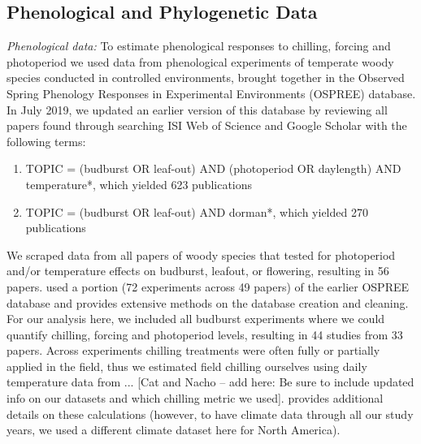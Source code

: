 \documentclass{article}\usepackage[]{graphicx}\usepackage[]{color}
\begin{document}
\subsection*{Phenological and Phylogenetic Data}
\emph{Phenological data:} To estimate phenological responses to chilling, forcing and photoperiod we used data from phenological experiments of temperate woody species conducted in controlled environments, brought together in the Observed Spring Phenology Responses in Experimental Environments (OSPREE) database. In July 2019, we updated an earlier version of this database \citep{wolkovich2019} by reviewing all papers found through searching ISI Web of Science and Google Scholar with the following terms: 
\begin{enumerate}
\item TOPIC = (budburst OR leaf-out) AND (photoperiod OR daylength) AND temperature*, which yielded 623 publications
\item TOPIC = (budburst OR leaf-out) AND dorman*, which yielded 270 publications
\end{enumerate}
We scraped data from all papers of woody species that tested for photoperiod and/or temperature effects on budburst, leafout, or flowering, resulting in 56 papers. \citet{ospreebbms} used a portion (72 experiments across 49 papers) of the earlier OSPREE database and provides extensive methods on the database creation and cleaning. For our analysis here, we included all budburst experiments where we could quantify chilling, forcing and photoperiod levels, resulting in 44 studies from 33 papers. 
Across experiments chilling treatments were often fully or partially applied in the field, thus we estimated field chilling ourselves using daily temperature data from ... [Cat and Nacho -- add here: Be sure to include updated info on our datasets and which chilling metric we used]. \citet{ospreebbms} provides additional details on these calculations (however, to have climate data through all our study years, we used a different climate dataset here for North America).\\ 
\end{document}
